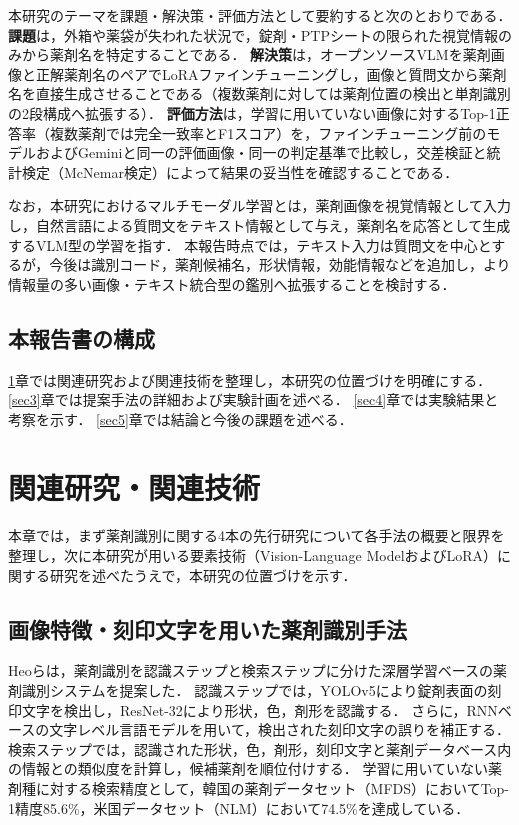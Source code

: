 \documentclass[dvipdfmx]{jsarticle}
\begin{document}
本研究のテーマを課題・解決策・評価方法として要約すると次のとおりである．
\textbf{課題}は，外箱や薬袋が失われた状況で，錠剤・PTPシートの限られた視覚情報のみから薬剤名を特定することである．
\textbf{解決策}は，オープンソースVLMを薬剤画像と正解薬剤名のペアでLoRAファインチューニングし，画像と質問文から薬剤名を直接生成させることである（複数薬剤に対しては薬剤位置の検出と単剤識別の2段構成へ拡張する）．
\textbf{評価方法}は，学習に用いていない画像に対するTop-1正答率（複数薬剤では完全一致率とF1スコア）を，ファインチューニング前のモデルおよびGeminiと同一の評価画像・同一の判定基準で比較し，交差検証と統計検定（McNemar検定）によって結果の妥当性を確認することである．

なお，本研究におけるマルチモーダル学習とは，薬剤画像を視覚情報として入力し，自然言語による質問文をテキスト情報として与え，薬剤名を応答として生成するVLM型の学習を指す．
本報告時点では，テキスト入力は質問文を中心とするが，今後は識別コード，薬剤候補名，形状情報，効能情報などを追加し，より情報量の多い画像・テキスト統合型の鑑別へ拡張することを検討する．

\subsection{本報告書の構成}

\ref{sec2}章では関連研究および関連技術を整理し，本研究の位置づけを明確にする．
\ref{sec3}章では提案手法の詳細および実験計画を述べる．
\ref{sec4}章では実験結果と考察を示す．
\ref{sec5}章では結論と今後の課題を述べる．

\newpage

\section{関連研究・関連技術}\label{sec2}

本章では，まず薬剤識別に関する4本の先行研究について各手法の概要と限界を整理し，次に本研究が用いる要素技術（Vision-Language ModelおよびLoRA）に関する研究を述べたうえで，本研究の位置づけを示す．

\subsection{画像特徴・刻印文字を用いた薬剤識別手法}

Heoら\cite{heo2023pill}は，薬剤識別を認識ステップと検索ステップに分けた深層学習ベースの薬剤識別システムを提案した．
認識ステップでは，YOLOv5により錠剤表面の刻印文字を検出し，ResNet-32により形状，色，剤形を認識する．
さらに，RNNベースの文字レベル言語モデルを用いて，検出された刻印文字の誤りを補正する．
検索ステップでは，認識された形状，色，剤形，刻印文字と薬剤データベース内の情報との類似度を計算し，候補薬剤を順位付けする．
学習に用いていない薬剤種に対する検索精度として，韓国の薬剤データセット（MFDS）においてTop-1精度85.6\%，米国データセット（NLM）において74.5\%を達成している．
\end{document}
